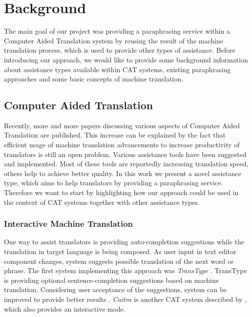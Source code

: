 \chapter{Background}


The main goal of our project was providing a paraphrasing service within a Computer Aided Translation system by reusing the result of the machine translation process, which is used to provide other types of assistance. Before introducing our approach, we would like to provide some background information about assistance types available within CAT systems, existing paraphrasing approaches and some basic concepts of machine translation.

\section{Computer Aided Translation}

Recently, more and more papers discussing various aspects of Computer Aided Translation are published. This increase can be explained by the fact that efficient usage of machine translation advancements to increase productivity of translators is still an open problem. Various assistance tools have been suggested and implemented. Most of these tools are reportedly increasing translation speed, others help to achieve better quality. In this work we present a novel assistance type, which aims to help translators by providing a paraphrasing service. Therefore we want to start by highlighting how our approach could be used in the context of CAT systems together with other assistance types.

\subsection{Interactive Machine Translation}

One way to assist translators is providing auto-completion suggestions while the translation in target language is being composed. As user input in text editor component changes, system suggests possible translation of the next word or phrase. The first system implementing this approach was \emph{TransType} \citep{langlais2000transtype}. TransType is providing optional sentence-completion suggestions based on machine translation. Considering user acceptance of the suggestions, system can be improved to provide better results \citep{barrachina2009statistical}. \emph{Caitra} is another CAT system described by \cite{KoehnHaddow2009}, which also provides an interactive mode. 

